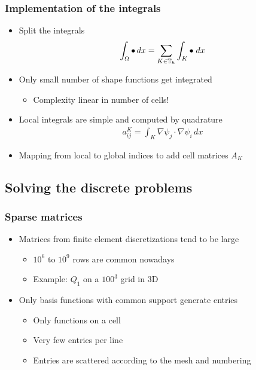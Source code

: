 \begin{frame}
  \frametitle{Implementation of the integrals}
  \begin{itemize}
  \item Split the integrals
    \begin{gather*}
      \int_\Omega \bullet \, dx = \sum_{K \in \mathbb T_h}\int_K \bullet \; dx
    \end{gather*}
  \item Only small number of shape functions get integrated
    \begin{itemize}
    \item Complexity linear in number of cells!
    \end{itemize}
  \item Local integrals are simple and computed by quadrature
    \begin{gather*}
      a_{ij}^K = \int_K \nabla \psi_j \cdot \nabla \psi_i\,d x
    \end{gather*}
  \item Mapping from local to global indices to add cell matrices $A_K$
  \end{itemize}
\end{frame}

\subsection{Solving the discrete problems}

\begin{frame}
  \frametitle{Sparse matrices}
  \begin{itemize}
  \item Matrices from finite element discretizations tend to be large
    \begin{itemize}
    \item $10^6$ to $10^9$ rows are common nowadays
    \item Example: $Q_1$ on a $100^3$ grid in 3D
    \end{itemize}
  \item Only basis functions with common support generate entries
    \begin{itemize}
    \item Only functions on a cell
    \item Very few entries per line
    \item Entries are scattered according to the mesh and numbering
    \end{itemize}
  \end{itemize}
\end{frame}

